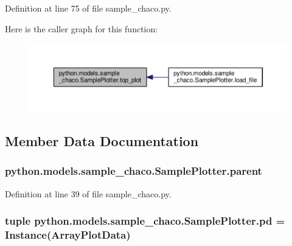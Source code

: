 Definition at line 75 of file sample\-\_\-chaco.\-py.



Here is the caller graph for this function\-:
\nopagebreak
\begin{figure}[H]
\begin{center}
\leavevmode
\includegraphics[width=350pt]{classpython_1_1models_1_1sample__chaco_1_1_sample_plotter_ae382276213295a96061b8e697deff5a3_icgraph}
\end{center}
\end{figure}




\subsection{Member Data Documentation}
\hypertarget{classpython_1_1models_1_1sample__chaco_1_1_sample_plotter_a72598627a6755b564504c97dc9a2e51f}{
\subsubsection[{parent}]{\setlength{\rightskip}{0pt plus 5cm}python.\-models.\-sample\-\_\-chaco.\-Sample\-Plotter.\-parent}}\label{classpython_1_1models_1_1sample__chaco_1_1_sample_plotter_a72598627a6755b564504c97dc9a2e51f}


Definition at line 39 of file sample\-\_\-chaco.\-py.

\hypertarget{classpython_1_1models_1_1sample__chaco_1_1_sample_plotter_a8625d6b9b25c286a584e68c029205324}{
\subsubsection[{pd}]{\setlength{\rightskip}{0pt plus 5cm}tuple python.\-models.\-sample\-\_\-chaco.\-Sample\-Plotter.\-pd = Instance(Array\-Plot\-Data)\hspace{0.3cm}{\ttfamily [static]}}}\label{classpython_1_1models_1_1sample__chaco_1_1_sample_plotter_a8625d6b9b25c286a584e68c029205324}



